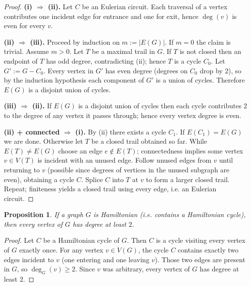 \documentclass{article}
\theoremstyle{plain}
\newtheorem{proposition}{Proposition}
\theoremstyle{definition}
\theoremstyle{remark}
\begin{document}
\begin{proof}
\textbf{(i) $\Rightarrow$ (ii).}
Let \(C\) be an Eulerian circuit. Each traversal of a vertex contributes one incident edge for entrance and one for exit, hence \(\deg(v)\) is even for every \(v\).

\medskip
\noindent
\textbf{(ii) $\Rightarrow$ (iii).}
Proceed by induction on \(m:=|E(G)|\). If \(m=0\) the claim is trivial. Assume \(m>0\).
Let \(T\) be a maximal trail in \(G\). If \(T\) is not closed then an endpoint of \(T\) has odd degree, contradicting (ii); hence \(T\) is a cycle \(C_0\).
Let \(G':=G-C_0\). Every vertex in \(G'\) has even degree (degrees on \(C_0\) drop by \(2\)), so by the induction hypothesis each component of \(G'\) is a union of cycles. Therefore \(E(G)\) is a disjoint union of cycles.

\medskip
\noindent
\textbf{(iii) $\Rightarrow$ (ii).}
If \(E(G)\) is a disjoint union of cycles then each cycle contributes \(2\) to the degree of any vertex it passes through; hence every vertex degree is even.

\medskip
\noindent
\textbf{(ii) + connected $\Rightarrow$ (i).}
By (ii) there exists a cycle \(C_1\). If \(E(C_1)=E(G)\) we are done. Otherwise let \(T\) be a closed trail obtained so far. While \(E(T)\neq E(G)\) choose an edge \(e\notin E(T)\); connectedness implies some vertex \(v\in V(T)\) is incident with an unused edge. Follow unused edges from \(v\) until returning to \(v\) (possible since degrees of vertices in the unused subgraph are even), obtaining a cycle \(C\). Splice \(C\) into \(T\) at \(v\) to form a larger closed trail. Repeat; finiteness yields a closed trail using every edge, i.e. an Eulerian circuit.
\end{proof}


\begin{proposition}
If a graph \(G\) is Hamiltonian (i.e. contains a Hamiltonian cycle), then every vertex of \(G\) has degree at least \(2\).
\end{proposition}

\begin{proof}
Let \(C\) be a Hamiltonian cycle of \(G\). Then \(C\) is a cycle visiting every vertex of \(G\) exactly once. For any vertex \(v\in V(G)\), the cycle \(C\) contains exactly two edges incident to \(v\) (one entering and one leaving \(v\)). Those two edges are present in \(G\), so \(\deg_G(v)\ge 2\). Since \(v\) was arbitrary, every vertex of \(G\) has degree at least \(2\).
\end{proof}
\end{document}
